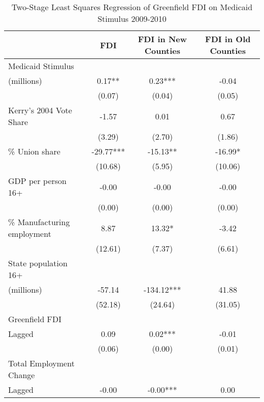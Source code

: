 \begin{table}[!htbp]\centering
\def\sym#1{\ifmmode^{#1}\else\(^{#1}\)\fi}
\caption{Two-Stage Least Squares Regression of Greenfield FDI on Medicaid Stimulus 2009-2010}
\begin{tabular}{l*{3}{c}}
\hline\hline
                    &                 FDI   & FDI in New Counties   & FDI in Old Counties   \\
\hline
Medicaid Stimulus \\ (millions)&                0.17** &                0.23***&               -0.04   \\
                    &              (0.07)   &              (0.04)   &              (0.05)   \\
Kerry's 2004 Vote Share&               -1.57   &                0.01   &                0.67   \\
                    &              (3.29)   &              (2.70)   &              (1.86)   \\
\% Union share      &              -29.77***&              -15.13** &              -16.99*  \\
                    &             (10.68)   &              (5.95)   &             (10.06)   \\
GDP per person 16+  &               -0.00   &               -0.00   &               -0.00   \\
                    &              (0.00)   &              (0.00)   &              (0.00)   \\
\% Manufacturing employment&                8.87   &               13.32*  &               -3.42   \\
                    &             (12.61)   &              (7.37)   &              (6.61)   \\
 State population 16+ \\ (millions)&              -57.14   &             -134.12***&               41.88   \\
                    &             (52.18)   &             (24.64)   &             (31.05)   \\
Greenfield FDI \\ Lagged&                0.09   &                0.02***&               -0.01   \\
                    &              (0.06)   &              (0.00)   &              (0.01)   \\
Total Employment Change \\ Lagged&               -0.00   &               -0.00***&                0.00   \\

\end{tabular}
\end{table}
